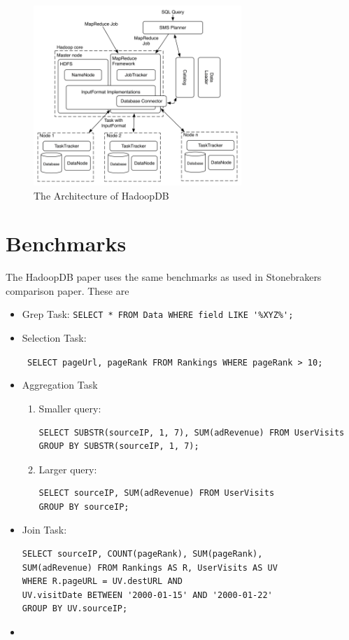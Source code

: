 \documentclass[12pt,a4paper]{scrartcl}		%
\begin{document}
\begin{figure}[t]
  \centering
  \includegraphics[width=0.7\textwidth]{images/hadoopdb-arch.png}
  \caption{The Architecture of HadoopDB\cite{journals/pvldb/AbouzeidBARS09}}
  \label{fig:hadoopdbarch}
\end{figure}

\section{Benchmarks}
The HadoopDB paper uses the same benchmarks as used in Stonebrakers comparison paper. These are
\begin{itemize}
\item Grep Task: \verb+SELECT * FROM Data WHERE field LIKE '%XYZ%';+
\item Selection Task: 

\verb+ SELECT pageUrl, pageRank FROM Rankings WHERE pageRank > 10;+
\item Aggregation Task
  \begin{enumerate}
  \item Smaller query:
\begin{verbatim}
SELECT SUBSTR(sourceIP, 1, 7), SUM(adRevenue) FROM UserVisits 
GROUP BY SUBSTR(sourceIP, 1, 7);
\end{verbatim}

  \item Larger query:
\begin{verbatim}
SELECT sourceIP, SUM(adRevenue) FROM UserVisits 
GROUP BY sourceIP;
\end{verbatim}

  \end{enumerate}
  \item Join Task:
\begin{verbatim}
SELECT sourceIP, COUNT(pageRank), SUM(pageRank),
SUM(adRevenue) FROM Rankings AS R, UserVisits AS UV
WHERE R.pageURL = UV.destURL AND
UV.visitDate BETWEEN '2000-01-15' AND '2000-01-22'
GROUP BY UV.sourceIP;
\end{verbatim}
  \item
\end{itemize}
\end{document}
